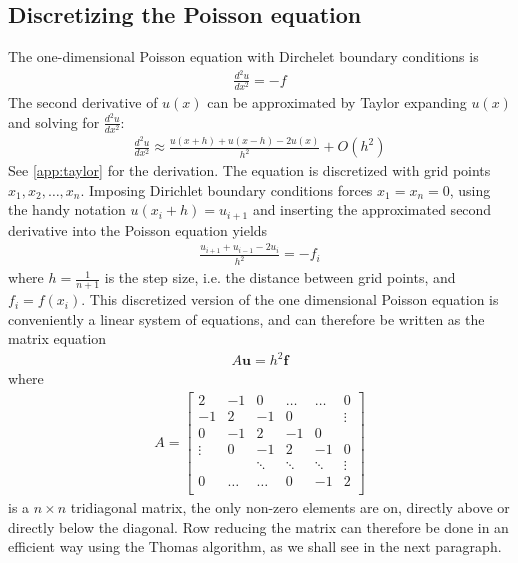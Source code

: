 \documentclass[aps,reprint]{revtex4-1}
\begin{document}
\subsection{Discretizing the Poisson equation}
The one-dimensional Poisson equation with Dirchelet boundary conditions is
\begin{align*}
  \frac{d^2 u}{d x^2} = - f
\end{align*}
The second derivative of $u(x)$ can be approximated by Taylor expanding \(u(x)\)
and solving for $\frac{d^2 u}{d x^2}$:
\begin{align*}
  \frac{d^2 u}{d x^2} \approx \frac{u(x+h) + u(x-h) - 2 u(x)}{h^2} + O(h^2)
\end{align*}
See \ref{app:taylor} for the derivation.
The equation is discretized with grid points $x_1, x_2, \hdots, x_{n}$. Imposing
Dirichlet boundary conditions forces $x_1 = x_n = 0$, using the handy notation
$u(x_i + h) = u_{i+1}$ and inserting the approximated second derivative into the
Poisson equation yields
\begin{align*}
  \frac{u_{i+1} + u_{i-1} - 2 u_i}{h^2} = -f_i
\end{align*}
where $h = \frac{1}{n+1}$ is the step size, i.e. the distance between grid points, and
$f_i = f(x_i)$. This discretized version of the one dimensional Poisson equation is
conveniently a linear system of equations, and can therefore be written
as the matrix equation
\begin{align*}
  A \mathbf{u} = h^2 \mathbf{f}
\end{align*}
where
\begin{align*}
  A =
  \begin{bmatrix}
    2 & -1 & 0  & \hdots & \hdots &   0    \\
    -1 & 2 & -1 & 0      & &\vdots \\
    0 & -1 & 2  & -1     & 0 &  \\
    \vdots & 0 & -1  & 2     & -1 & 0 \\
    & & \ddots & \ddots & \ddots & \vdots\\
    0 & \hdots  &\hdots & 0 &-1 & 2 \\
\end{bmatrix}
\end{align*}
is a $n \times n$ tridiagonal matrix, the only non-zero elements are on,
directly above or directly below the diagonal. Row reducing the matrix can therefore
be done in an efficient way using the Thomas algorithm, as we shall see in the next paragraph.
\end{document}
